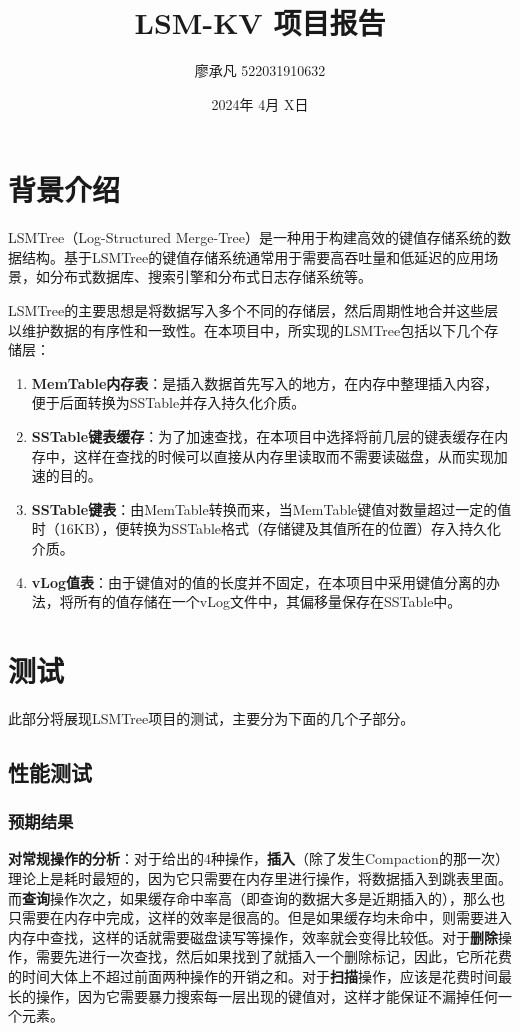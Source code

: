 \documentclass{article}
\title{LSM-KV 项目报告}
\author{廖承凡 522031910632}
\date{2024年 4月 X日}
\begin{document}
\maketitle

\section{背景介绍}

LSMTree（Log-Structured Merge-Tree）是一种用于构建高效的键值存储系统的数据结构。基于LSMTree的键值存储系统通常用于需要高吞吐量和低延迟的应用场景，如分布式数据库、搜索引擎和分布式日志存储系统等。

LSMTree的主要思想是将数据写入多个不同的存储层，然后周期性地合并这些层以维护数据的有序性和一致性。在本项目中，所实现的LSMTree包括以下几个存储层：

\begin{enumerate}
    \item \textbf{MemTable内存表}：是插入数据首先写入的地方，在内存中整理插入内容，便于后面转换为SSTable并存入持久化介质。
    \item \textbf{SSTable键表缓存}：为了加速查找，在本项目中选择将前几层的键表缓存在内存中，这样在查找的时候可以直接从内存里读取而不需要读磁盘，从而实现加速的目的。
    \item \textbf{SSTable键表}：由MemTable转换而来，当MemTable键值对数量超过一定的值时（16KB），便转换为SSTable格式（存储键及其值所在的位置）存入持久化介质。
    \item \textbf{vLog值表}：由于键值对的值的长度并不固定，在本项目中采用键值分离的办法，将所有的值存储在一个vLog文件中，其偏移量保存在SSTable中。
\end{enumerate}

\section{测试}

此部分将展现LSMTree项目的测试，主要分为下面的几个子部分。

\subsection{性能测试}

\subsubsection{预期结果}

\textbf{对常规操作的分析}：对于给出的4种操作，\textbf{插入}（除了发生Compaction的那一次）理论上是耗时最短的，因为它只需要在内存里进行操作，将数据插入到跳表里面。而\textbf{查询}操作次之，如果缓存命中率高（即查询的数据大多是近期插入的），那么也只需要在内存中完成，这样的效率是很高的。但是如果缓存均未命中，则需要进入内存中查找，这样的话就需要磁盘读写等操作，效率就会变得比较低。对于\textbf{删除}操作，需要先进行一次查找，然后如果找到了就插入一个删除标记，因此，它所花费的时间大体上不超过前面两种操作的开销之和。对于\textbf{扫描}操作，应该是花费时间最长的操作，因为它需要暴力搜索每一层出现的键值对，这样才能保证不漏掉任何一个元素。
\end{document}

